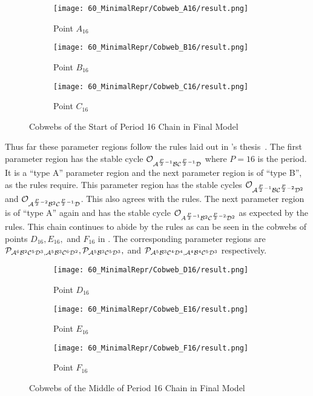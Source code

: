\begin{figure}
    \centering
    \begin{subfigure}{0.3\textwidth}
        \centering
        \texttt{[image: 60\_MinimalRepr/Cobweb\_A16/result.png]}
        \caption{Point $A_{16}$}
        \label{fig:final.cob.A16}
    \end{subfigure}
    \begin{subfigure}{0.3\textwidth}
        \centering
        \texttt{[image: 60\_MinimalRepr/Cobweb\_B16/result.png]}
        \caption{Point $B_{16}$}
        \label{fig:final.cob.B16}
    \end{subfigure}
    \begin{subfigure}{0.3\textwidth}
        \centering
        \texttt{[image: 60\_MinimalRepr/Cobweb\_C16/result.png]}
        \caption{Point $C_{16}$}
        \label{fig:final.cob.C16}
    \end{subfigure}
    \caption{Cobwebs of the Start of Period 16 Chain in Final Model}
    \label{fig:final.cob.start16}
\end{figure}

Thus far these parameter regions follow the rules laid out in 's thesis~\Cite{akyuz2022}.
The first parameter region has the stable cycle $\mathcal{O}_{\mathcal{A}^{\frac{P}{2} - 1}\mathcal{B}\mathcal{C}^{\frac{P}{2} - 1}\mathcal{D}}$ where $P = 16$ is the period.
It is a ``type A'' parameter region and the next parameter region is of ``type B'', as the rules require.
This parameter region has the stable cycles $\mathcal{O}_{\mathcal{A}^{\frac{P}{2} - 1}\mathcal{B}\mathcal{C}^{\frac{P}{2} - 2}\mathcal{D}^2}$ and $\mathcal{O}_{\mathcal{A}^{\frac{P}{2} - 2}\mathcal{B}^2\mathcal{C}^{\frac{P}{2} - 1}\mathcal{D}}$.
This also agrees with the rules.
The next parameter region is of ``type A'' again and has the stable cycle $\mathcal{O}_{A^{\frac{P}{2} - 1}\mathcal{B}^2\mathcal{C}^{\frac{P}{2} - 2}\mathcal{D}^2}$ as expected by the rules.
This chain continues to abide by the rules as can be seen in the cobwebs of points $D_{16}, E_{16},$ and $F_{16}$ in .
The corresponding parameter regions are $\mathcal{P}_{\mathcal{A}^6\mathcal{B}^2\mathcal{C}^5\mathcal{D}^3, \mathcal{A}^5\mathcal{B}^3\mathcal{C}^6\mathcal{D}^2}, \mathcal{P}_{\mathcal{A}^5\mathcal{B}^3\mathcal{C}^5\mathcal{D}^3},$ and $\mathcal{P}_{\mathcal{A}^5\mathcal{B}^3\mathcal{C}^4\mathcal{D}^4, \mathcal{A}^4\mathcal{B}^4\mathcal{C}^5\mathcal{D}^3}$ respectively.

\begin{figure}
    \centering
    \begin{subfigure}{0.3\textwidth}
        \centering
        \texttt{[image: 60\_MinimalRepr/Cobweb\_D16/result.png]}
        \caption{Point $D_{16}$}
        \label{fig:final.cob.D16}
    \end{subfigure}
    \begin{subfigure}{0.3\textwidth}
        \centering
        \texttt{[image: 60\_MinimalRepr/Cobweb\_E16/result.png]}
        \caption{Point $E_{16}$}
        \label{fig:final.cob.E16}
    \end{subfigure}
    \begin{subfigure}{0.3\textwidth}
        \centering
        \texttt{[image: 60\_MinimalRepr/Cobweb\_F16/result.png]}
        \caption{Point $F_{16}$}
        \label{fig:final.cob.F16}
    \end{subfigure}
    \caption{Cobwebs of the Middle of Period 16 Chain in Final Model}
    \label{fig:final.cob.mid16}
\end{figure}
